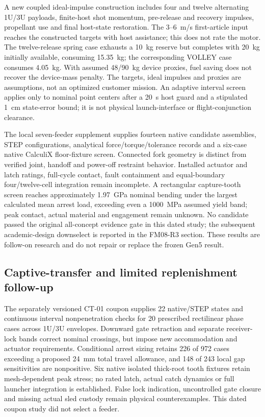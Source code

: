 \documentclass[conference]{IEEEtran}
\begin{document}
A new coupled ideal-impulse construction includes four and twelve alternating 1U/3U payloads, finite-host shot momentum, pre-release and recovery impulses, propellant use and final host-state restoration. The 3--6~m/s first-article input reaches the constructed targets with host assistance; this does not rate the motor. The twelve-release spring case exhausts a 10~kg reserve but completes with 20~kg initially available, consuming 15.35~kg; the corresponding VOLLEY case consumes 4.05~kg. With assumed 48/90~kg device proxies, fuel saving does not recover the device-mass penalty. The targets, ideal impulses and proxies are assumptions, not an optimized customer mission. An adaptive interval screen applies only to nominal point centers after a 20~s host guard and a stipulated 1~cm state-error bound; it is not physical launch-interface or flight-conjunction clearance.

The local seven-feeder supplement supplies fourteen native candidate assemblies, STEP configurations, analytical force/torque/tolerance records and a six-case native CalculiX floor-fixture screen. Connected fork geometry is distinct from verified joint, handoff and power-off restraint behavior. Installed actuator and latch ratings, full-cycle contact, fault containment and equal-boundary four/twelve-cell integration remain incomplete. A rectangular capture-tooth screen reaches approximately 1.97~GPa nominal bending under the largest calculated mean arrest load, exceeding even a 1000~MPa assumed yield band; peak contact, actual material and engagement remain unknown. No candidate passed the original all-concept evidence gate in this dated study; the subsequent academic-design downselect is reported in the FM08-R3 section. These results are follow-on research and do not repair or replace the frozen Gen5 result.


\subsection{Captive-transfer and limited replenishment follow-up}
The separately versioned CT-01 coupon supplies 22 native/STEP states and continuous interval nonpenetration checks for 20 prescribed rectilinear phase cases across 1U/3U envelopes. Downward gate retraction and separate receiver-lock bands correct nominal crossings, but impose new accommodation and actuator requirements. Conditional arrest sizing retains 226 of 972 cases exceeding a proposed 24~mm total travel allowance, and 148 of 243 local gap sensitivities are nonpositive. Six native isolated thick-root tooth fixtures retain mesh-dependent peak stress; no rated latch, actual catch dynamics or full launcher integration is established. False lock indication, uncontrolled gate closure and missing actual sled custody remain physical counterexamples. This dated coupon study did not select a feeder.
\end{document}
